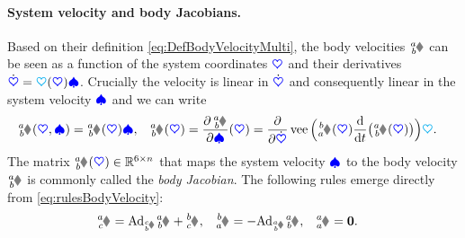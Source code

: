 \paragraph{System velocity and body Jacobians.}
Based on their definition \eqref{eq:DefBodyVelocityMulti}, the body velocities $\bodyVel{\BidxI}{\BidxII}$ can be seen as a function of the system coordinates $\boldsymbol{\textcolor{blue}{\heartsuit}}$ and their derivatives $\dot{\boldsymbol{\textcolor{blue}{\heartsuit}}} = \boldsymbol{\textcolor{cyan}{\heartsuit}}(\boldsymbol{\textcolor{blue}{\heartsuit}})\boldsymbol{\textcolor{blue}{\spadesuit}}$.
Crucially the velocity is linear in $\dot{\boldsymbol{\textcolor{blue}{\heartsuit}}}$ and consequently linear in the system velocity $\boldsymbol{\textcolor{blue}{\spadesuit}}$ and we can write
\begin{align}\label{eq:DefBodyJacobian}
 \bodyVel{\BidxI}{\BidxII}(\sysCoord, \sysVel) &= \bodyJac{\BidxI}{\BidxII}(\sysCoord) \sysVel,&
 \bodyJac{\BidxI}{\BidxII}(\sysCoord) &= \pdiff[\,\bodyVel{\BidxI}{\BidxII}]{\sysVel}(\sysCoord) = \pdiff{\sysCoordd} \veeOp\Big( \bodyHomoCoord{\BidxII}{\BidxI}(\sysCoord) \diff{t} \big(\bodyHomoCoord{\BidxI}{\BidxII}(\sysCoord) \big) \Big) \kinMat.
\end{align}
The matrix $\bodyJac{\BidxI}{\BidxII}(\sysCoord) \in \RealNum^{6\times\dimConfigSpace}$ that maps the system velocity $\boldsymbol{\textcolor{blue}{\spadesuit}}$ to the body velocity $\bodyVel{\BidxI}{\BidxII}$ is commonly called the \textit{body Jacobian}.
The following rules emerge directly from \eqref{eq:rulesBodyVelocity}:
\begin{align}\label{eq:rulesBodyJacobian}
 \bodyJac{\BidxI}{\BidxIII} &= \Ad{\bodyHomoCoord{\BidxIII}{\BidxII}} \bodyJac{\BidxI}{\BidxII} + \bodyJac{\BidxII}{\BidxIII},&
 \bodyJac{\BidxII}{\BidxI} &= -\Ad{\bodyHomoCoord{\BidxI}{\BidxII}} \bodyJac{\BidxI}{\BidxII},&
 \bodyJac{\BidxI}{\BidxI} &= \mat{0}.
\end{align}

